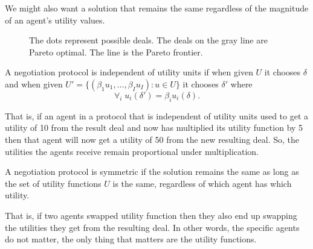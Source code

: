 We might also want a solution that remains the same regardless of the
magnitude of an agent's utility values.

\begin{SCfigure}
  \begin{minipage}{1.0\linewidth}
    \begin{center}
    \end{center}
  \end{minipage}

\caption{The dots represent possible deals. The deals on the gray line
  are Pareto optimal. The line is the Pareto frontier.}
  \label{fig:paretofrontier}
\end{SCfigure}

\begin{definition}
  \label{def:iuu}
  A negotiation protocol is independent of utility units if when given
  $U$ it chooses $\delta$ and when given $U' =\{(\beta_1
  u_1,\ldots,\beta_I u_I): u \in U\}$ it chooses $\delta'$ where
  \[\forall_i \; u_i(\delta') = \beta_i u_i(\delta).\]
\end{definition}
That is, if an agent in a protocol that is independent of utility
units used to get a utility of 10 from the result deal and now has
multiplied its utility function by 5 then that agent will now get a
utility of 50 from the new resulting deal. So, the utilities the
agents receive remain proportional under multiplication.

\begin{definition}[Symmetry]
  \label{def:symmetric}
  A negotiation protocol is symmetric if the solution remains the same
  as long as the set of utility functions $U$ is the same, regardless
  of which agent has which utility.
\end{definition}
That is, if two agents swapped utility function then they also end up
swapping the utilities they get from the resulting deal. In other
words, the specific agents do not matter, the only thing that matters
are the utility functions.

